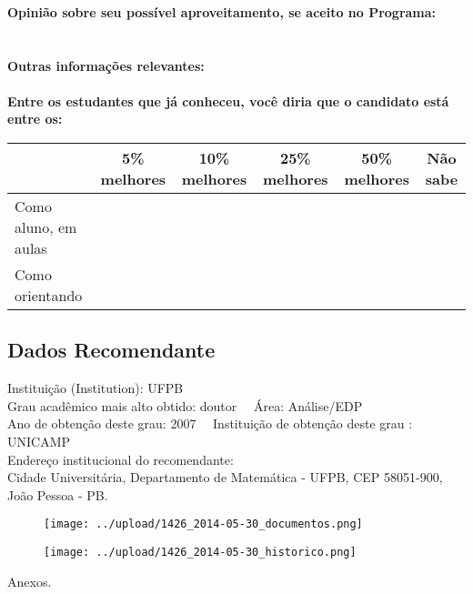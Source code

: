 \documentclass[11pt]{article}
\begin{document}
\\\\
\\
\textbf{Opinião sobre seu possível aproveitamento, se aceito no Programa:}
\\\\ 
\\
\textbf{Outras informações relevantes:} \\
\\[0.3cm]
\textbf{Entre os estudantes que já conheceu, você diria que o candidato está entre os:}
\\
\begin{tabular}{|l|c|c|c|c|c|}
\hline
 & 5\% melhores & 10\% melhores & 25\% melhores & 50\% melhores & Não sabe \\
\hline
Como aluno, em aulas &  &  &  &  & \\
\hline
Como orientando &  &  &  &  & \\
\hline
\end{tabular}
\subsection*{Dados Recomendante} 
	Instituição (Institution): UFPB
\\ 
	Grau acadêmico mais alto obtido: doutor
	\ \ Área: Análise/EDP
	\\
	Ano de obtenção deste grau: 2007
	\ \ 
	Instituição de obtenção deste grau : UNICAMP
	\\ 
	Endereço institucional do recomendante: \\ Cidade Universitária, Departamento de Matemática - UFPB, CEP 58051-900, João Pessoa - PB.	
\begin{figure}[!htb]
\texttt{[image: ../upload/1426\_2014-05-30\_documentos.png]}
\end{figure}	
\begin{figure}[!htb]
\texttt{[image: ../upload/1426\_2014-05-30\_historico.png]}
\end{figure} 
\begin{center}
Anexos.
\end{center}
\end{document}
